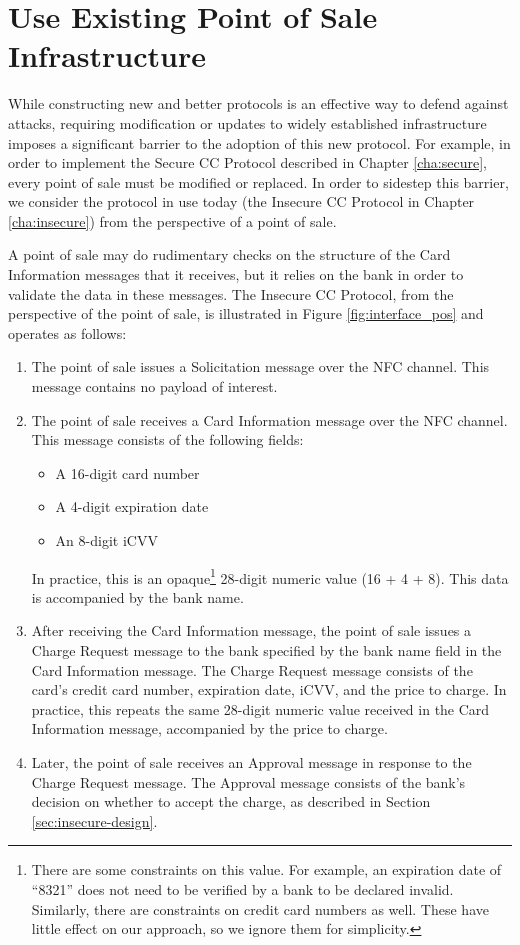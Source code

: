 \section{Use Existing Point of Sale Infrastructure}
\label{sec:goals-infrastructure}

While constructing new and better protocols is an effective way to defend against attacks,
	requiring modification or updates to widely established infrastructure imposes a significant barrier to the adoption of this new protocol.
For example, in order to implement the Secure CC Protocol described in Chapter \ref{cha:secure}, every point of sale must be modified or replaced.
In order to sidestep this barrier, we consider the protocol in use today (the Insecure CC Protocol in Chapter \ref{cha:insecure}) from the perspective of a point of sale.

A point of sale may do rudimentary checks on the structure of the Card Information messages that it receives,
	but it relies on the bank in order to validate the data in these messages.
The Insecure CC Protocol, from the perspective of the point of sale, is illustrated in Figure \ref{fig:interface_pos} and operates as follows:

\begin{enumerate}
\item The point of sale issues a Solicitation message over the NFC channel.
	This message contains no payload of interest.
\item The point of sale receives a Card Information message over the NFC channel.
	This message consists of the following fields:
	\begin{itemize}
	\item A 16-digit card number
	\item A 4-digit expiration date
	\item An 8-digit iCVV
	\end{itemize}
	In practice, this is an opaque\footnote{
        There are some constraints on this value.
        For example, an expiration date of ``8321'' does not need to be verified by a bank to be declared invalid.
        Similarly, there are constraints on credit card numbers as well.
        These have little effect on our approach, so we ignore them for simplicity.
    }
    28-digit numeric value (16 + 4 + 8).
    This data is accompanied by the bank name.
\item After receiving the Card Information message,
	the point of sale issues a Charge Request message to the bank specified by the bank name field in the Card Information message.
	The Charge Request message consists of the card's credit card number, expiration date, iCVV, and the price to charge.
	In practice, this repeats the same 28-digit numeric value received in the Card Information message, accompanied by the price to charge.
\item Later, the point of sale receives an Approval message in response to the Charge Request message.
	The Approval message consists of the bank's decision on whether to accept the charge, as described in Section \ref{sec:insecure-design}.
\end{enumerate}

